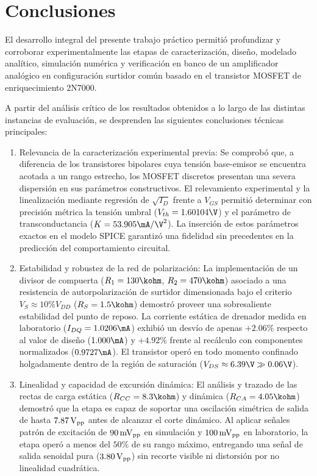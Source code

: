 \chapter{Conclusiones}
\label{chap:conclusiones}

El desarrollo integral del presente trabajo práctico permitió profundizar y corroborar experimentalmente las etapas de
caracterización, diseño, modelado analítico, simulación numérica y verificación en banco de un amplificador analógico
en configuración surtidor común basado en el transistor MOSFET de enriquecimiento 2N7000.

A partir del análisis crítico de los resultados obtenidos a lo largo de las distintas instancias de evaluación, se
desprenden las siguientes conclusiones técnicas principales:

\begin{enumerate}
  \item Relevancia de la caracterización experimental previa: Se comprobó que, a diferencia de los transistores bipolares
    cuya tensión base-emisor se encuentra acotada a un rango estrecho, los MOSFET discretos presentan una severa
    dispersión en sus parámetros constructivos. El relevamiento experimental y la linealización mediante regresión de
    $\sqrt{I_D}$ frente a $V_{GS}$ permitió determinar con precisión métrica la tensión umbral ($V_{th} = 1.60104\V$) y el
    parámetro de transconductancia ($K = 53.905\mA/\V^2$). La inserción de estos parámetros exactos en el modelo SPICE
    garantizó una fidelidad sin precedentes en la predicción del comportamiento circuital.

  \item Estabilidad y robustez de la red de polarización: La implementación de un divisor de compuerta ($R_1 = 130\kohm$,
    $R_2 = 470\kohm$) asociado a una resistencia de autorpolarización de surtidor dimensionada bajo el criterio
    $V_S \approx 10\% V_{DD}$ ($R_S = 1.5\kohm$) demostró proveer una sobresaliente estabilidad del punto de reposo.
    La corriente estática de drenador medida en laboratorio ($I_{DQ} = 1.0206\mA$) exhibió un desvío de apenas $+2.06\%$
    respecto al valor de diseño ($1.000\mA$) y $+4.92\%$ frente al recálculo con componentes normalizados ($0.9727\mA$).
    El transistor operó en todo momento confinado holgadamente dentro de la región de saturación ($V_{DS} \approx 6.39\V \gg 0.06\V$).

  \item Linealidad y capacidad de excursión dinámica: El análisis y trazado de las rectas de carga estática ($R_{CC} = 8.3\kohm$)
    y dinámica ($R_{CA} = 4.05\kohm$) demostró que la etapa es capaz de soportar una oscilación simétrica de salida de
    hasta $7.87\,\mathrm{V}_{\mathrm{pp}}$ antes de alcanzar el corte dinámico. Al aplicar señales patrón de excitación de $90\,\mathrm{mV}_{\mathrm{pp}}$ en simulación
    y $100\,\mathrm{mV}_{\mathrm{pp}}$ en laboratorio, la etapa operó a menos del $50\%$ de su rango máximo, entregando una señal de salida
    senoidal pura ($3.80\,\mathrm{V}_{\mathrm{pp}}$) sin recorte visible ni distorsión por no linealidad cuadrática.


\end{enumerate}
